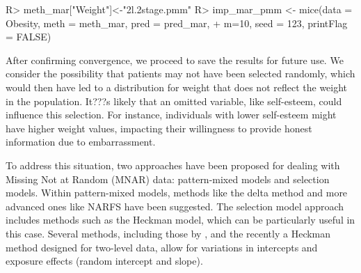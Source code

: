 \documentclass[
]{jss}
\begin{document}
\begin{CodeChunk}
\begin{CodeInput}
R> meth_mar["Weight"]<-"2l.2stage.pmm" 
R> imp_mar_pmm <- mice(data = Obesity, meth = meth_mar, pred = pred_mar,
+                     m=10, seed = 123, printFlag = FALSE)
\end{CodeInput}
\end{CodeChunk}

\begin{CodeChunk}
\end{CodeChunk}

After confirming convergence, we proceed to save the results for future
use. We consider the possibility that patients may not have been
selected randomly, which would then have led to a distribution for
weight that does not reflect the weight in the population. It???s likely
that an omitted variable, like self-esteem, could influence this
selection. For instance, individuals with lower self-esteem might have
higher weight values, impacting their willingness to provide honest
information due to embarrassment.

To address this situation, two approaches have been proposed for dealing
with Missing Not at Random (MNAR) data: pattern-mixed models and
selection models. Within pattern-mixed models, methods like the delta
method and more advanced ones like NARFS have been suggested. The
selection model approach includes methods such as the Heckman model,
which can be particularly useful in this case. Several methods,
including those by \cite{Galimar_2017,Hammon_2021}, and the recently a
Heckman method designed for two-level data, allow for variations in
intercepts and exposure effects (random intercept and slope).
\end{document}
